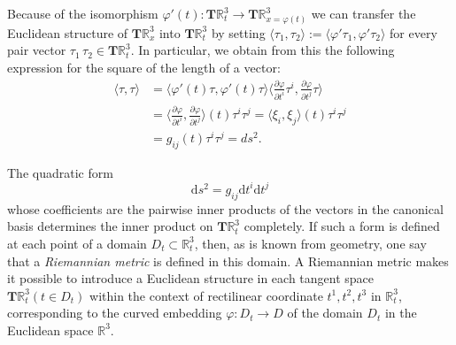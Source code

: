 \documentclass[a4paper,12pt]{article}
\begin{document}
\begin{CJK}{UTF8}{gbsn}
Because of the isomorphism $\varphi'(t): \bm{T}\mathbb{R}_t^3 \to \bm{T}
\mathbb{R}_{x=\varphi(t)}^3$ we can transfer the  Euclidean structure 
of $\bm{T}\mathbb{R}_x^3$ into $\bm{T}\mathbb{R}_t^3$ by setting 
$\langle \tau_1, \tau_2 \rangle := \langle \varphi'\tau_1, \varphi'\tau_2 \rangle$
for every pair vector $\tau_1\, \tau_2 \in \bm{T}\mathbb{R}_t^3$. In particular, 
we obtain from this the following expression for the square of the 
length of a vector:
\begin{equation}
    \begin{split}
        \langle \tau, \tau \rangle & = \langle \varphi'(t)\tau, \varphi'(t)\tau \rangle
        \langle \frac{\partial \varphi}{\partial t^i}\tau^i, \frac{\partial \varphi}{\partial t^j}
        \tau \rangle \\
        & = \langle \frac{\partial \varphi}{\partial t^i}, \frac{\partial \varphi}{\partial t^j}
        \rangle (t)\tau^i\tau^j = \langle \xi_i, \xi_j\rangle (t)\tau^i\tau^j \\
        & = g_{ij}(t)\tau^i\tau^j = ds^2.
    \end{split}
\end{equation}

The quadratic form 
\begin{equation}
    \mathrm{d}s^2 = g_{ij}\mathrm{d}t^i\mathrm{d}t^j
\end{equation}
whose coefficients are the pairwise inner products of the vectors in the 
canonical basis determines the inner product on $\bm{T}\mathbb{R}_t^3$ 
completely. If such a form is defined at each point of a domain $D_t \subset 
\mathbb{R}_t^3$, then, as is known from geometry, one say that a 
\textit{Riemannian metric} is defined in this domain. A Riemannian metric makes 
it possible to introduce a Euclidean structure in each tangent space 
$\bm{T}\mathbb{R}_t^3 (t\in D_t)$ within the context of rectilinear coordinate 
$t^1, t^2, t^3$ in $\mathbb{R}_t^3$, corresponding to the curved embedding 
$\varphi: D_t \to D$ of the domain $D_t$ in the Euclidean space $\mathbb{R}^3$.
\end{CJK}
\end{document}
